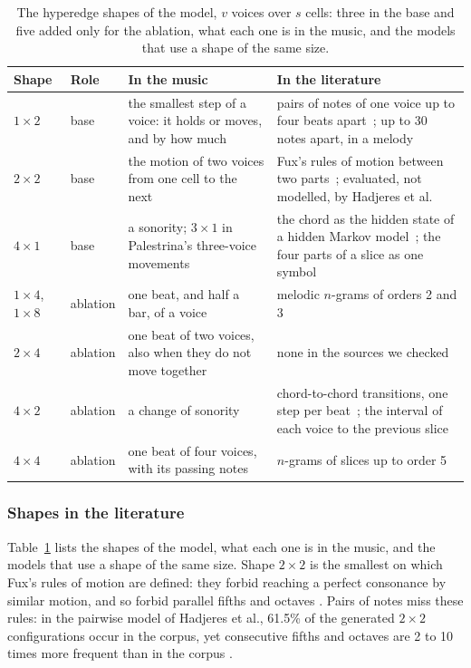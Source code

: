 \begin{table}[t]
\renewcommand{\arraystretch}{1.3}
\centering
\caption{The hyperedge shapes of the model, $v$ voices over $s$ cells: three in the base and five added only for the ablation, what each one is in the music, and the models that use a shape of the same size.}
\label{tab:shapes}
\begin{tabular}{@{}ll>{\raggedright\arraybackslash}p{4.6cm}>{\raggedright\arraybackslash}p{8.2cm}@{}}
\hline
Shape & Role & In the music & In the literature \\
\hline
$1 \times 2$ & base & the smallest step of a voice: it holds or moves, and by how much & pairs of notes of one voice up to four beats apart~\cite{hadjeres2016}; up to 30 notes apart, in a melody~\cite{sakellariou2017} \\
$2 \times 2$ & base & the motion of two voices from one cell to the next & Fux's rules of motion between two parts~\cite{fux1725}; evaluated, not modelled, by Hadjeres et al.~\cite{hadjeres2016} \\
$4 \times 1$ & base & a sonority; $3 \times 1$ in Palestrina's three-voice movements & the chord as the hidden state of a hidden Markov model~\cite{allan2004}; the four parts of a slice as one symbol~\cite{whorley2013} \\
$1 \times 4$, $1 \times 8$ & ablation & one beat, and half a bar, of a voice & melodic $n$-grams of orders 2 and 3~\cite{witten1993} \\
$2 \times 4$ & ablation & one beat of two voices, also when they do not move together & none in the sources we checked \\
$4 \times 2$ & ablation & a change of sonority & chord-to-chord transitions, one step per beat~\cite{allan2004}; the interval of each voice to the previous slice~\cite{conklin2002} \\
$4 \times 4$ & ablation & one beat of four voices, with its passing notes & $n$-grams of slices up to order 5~\cite{whorley2013} \\
\hline
\end{tabular}
\end{table}

\subsubsection{Shapes in the literature}
Table~\ref{tab:shapes} lists the shapes of the model, what each one is in the music, and the models that use a shape of the same size. Shape $2 \times 2$ is the smallest on which Fux's rules of motion are defined: they forbid reaching a perfect consonance by similar motion, and so forbid parallel fifths and octaves \cite{fux1725}. Pairs of notes miss these rules: in the pairwise model of Hadjeres et al., 61.5\% of the generated $2 \times 2$ configurations occur in the corpus, yet consecutive fifths and octaves are 2 to 10 times more frequent than in the corpus \cite{hadjeres2016}.

